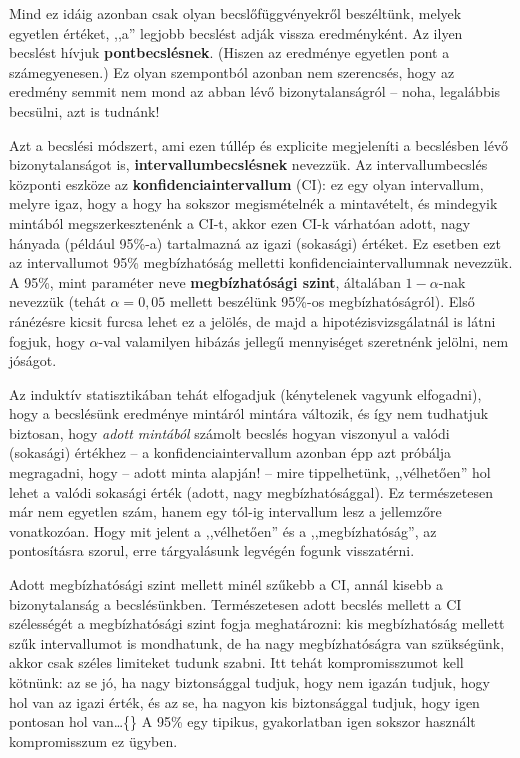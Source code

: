 \documentclass[
]{book}
\begin{document}
Mind ez idáig azonban csak olyan becslőfüggvényekről beszéltünk, melyek egyetlen értéket, ,,a'' legjobb becslést adják vissza eredményként. Az ilyen becslést hívjuk \textbf{pontbecslésnek}. (Hiszen az eredménye egyetlen pont a számegyenesen.) Ez olyan szempontból azonban nem szerencsés, hogy az eredmény semmit nem mond az abban lévő bizonytalanságról -- noha, legalábbis becsülni, azt is tudnánk!

Azt a becslési módszert, ami ezen túllép és explicite megjeleníti a becslésben lévő bizonytalanságot is, \textbf{intervallumbecslésnek} nevezzük. Az intervallumbecslés központi eszköze az \textbf{konfidenciaintervallum} (CI): ez egy olyan intervallum, melyre igaz, hogy a hogy ha sokszor megismételnék a mintavételt, és mindegyik mintából megszerkesztenénk a CI-t, akkor ezen CI-k várhatóan adott, nagy hányada (például 95\%-a) tartalmazná az igazi (sokasági) értéket. Ez esetben ezt az intervallumot 95\% megbízhatóság melletti konfidenciaintervallumnak nevezzük. A 95\%, mint paraméter neve \textbf{megbízhatósági szint}, általában \(1-\alpha\)-nak nevezzük (tehát \(\alpha=0,\!05\) mellett beszélünk 95\%-os megbízhatóságról). Első ránézésre kicsit furcsa lehet ez a jelölés, de majd a hipotézisvizsgálatnál is látni fogjuk, hogy \(\alpha\)-val valamilyen hibázás jellegű mennyiséget szeretnénk jelölni, nem jóságot.

Az induktív statisztikában tehát elfogadjuk (kénytelenek vagyunk elfogadni), hogy a becslésünk eredménye mintáról mintára változik, és így nem tudhatjuk biztosan, hogy \emph{adott mintából} számolt becslés hogyan viszonyul a valódi (sokasági) értékhez -- a konfidenciaintervallum azonban épp azt próbálja megragadni, hogy -- adott minta alapján! -- mire tippelhetünk, ,,vélhetően'' hol lehet a valódi sokasági érték (adott, nagy megbízhatósággal). Ez természetesen már nem egyetlen szám, hanem egy tól-ig intervallum lesz a jellemzőre vonatkozóan. Hogy mit jelent a ,,vélhetően'' és a ,,megbízhatóság'', az pontosításra szorul, erre tárgyalásunk legvégén fogunk visszatérni.

Adott megbízhatósági szint mellett minél szűkebb a CI, annál kisebb a bizonytalanság a becslésünkben. Természetesen adott becslés mellett a CI szélességét a megbízhatósági szint fogja meghatározni: kis megbízhatóság mellett szűk intervallumot is mondhatunk, de ha nagy megbízhatóságra van szükségünk, akkor csak széles limiteket tudunk szabni. Itt tehát kompromisszumot kell kötnünk: az se jó, ha nagy biztonsággal tudjuk, hogy nem igazán tudjuk, hogy hol van az igazi érték, és az se, ha nagyon kis biztonsággal tudjuk, hogy igen pontosan hol van\dots\{\} A 95\% egy tipikus, gyakorlatban igen sokszor használt kompromisszum ez ügyben.
\end{document}
